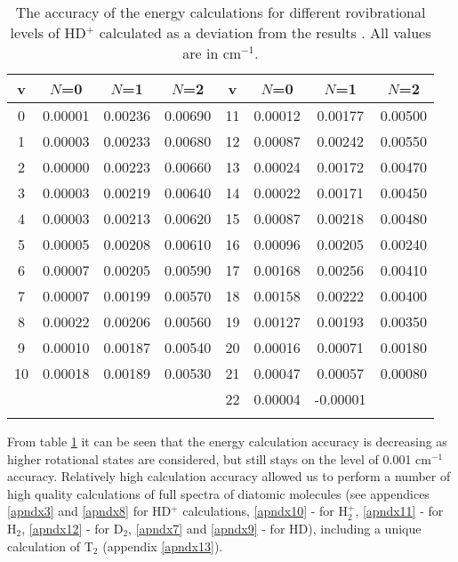 \begin{table}[t]
\caption[The accuracy of the energy 
calculations for different
rovibrational levels of HD$^+$]{The accuracy of the energy 
calculations for different
rovibrational levels of HD$^+$
calculated as a deviation from the results \cite{Karr}. 
All values are in cm$^{-1}$.}
\centering
\def\arraystretch{1.}
\setlength{\tabcolsep}{.75em}
\begin{tabular}{c c c c | c c c c}
\hline \hline
v & $N$=0 & $N$=1 & $N$=2 & v & $N$=0 & $N$=1 & $N$=2  \\
\hline
0	&	0.00001	&	0.00236	&	0.00690	& 11	&	0.00012	&	0.00177	&	0.00500	\\
1	&	0.00003	&	0.00233	&	0.00680	& 12	&	0.00087	&	0.00242	&	0.00550	\\
2	&	0.00000	&	0.00223	&	0.00660	& 13	&	0.00024	&	0.00172	&	0.00470	\\
3	&	0.00003	&	0.00219	&	0.00640	& 14	&	0.00022	&	0.00171	&	0.00450	\\
4	&	0.00003	&	0.00213	&	0.00620	& 15	&	0.00087	&	0.00218	&	0.00480	\\
5	&	0.00005	&	0.00208	&	0.00610	& 16	&	0.00096	&	0.00205	&	0.00240	\\
6	&	0.00007	&	0.00205	&	0.00590	& 17	&	0.00168	&	0.00256	&	0.00410	\\
7	&	0.00007	&	0.00199	&	0.00570	& 18	&	0.00158	&	0.00222	&	0.00400	\\
8	&	0.00022	&	0.00206	&	0.00560	& 19	&	0.00127	&	0.00193	&	0.00350	\\
9	&	0.00010	&	0.00187	&	0.00540	& 20	&	0.00016	&	0.00071	&	0.00180	\\
10	&	0.00018	&	0.00189	&	0.00530	& 21	&	0.00047	&	0.00057	&	0.00080	\\
    &            &           &           & 22	&	0.00004	&	-0.00001	&	     \\
\hline
\label{table_energy}
\end{tabular}
\end{table}

From table \ref{table_energy} it can be seen that the energy calculation
accuracy is decreasing as higher rotational states are considered, but still
stays on the level of 0.001 cm$^{-1}$ accuracy.
Relatively high calculation accuracy allowed us to perform a number
of high quality calculations of full spectra of diatomic molecules
(see appendices \ref{apndx3} and \ref{apndx8} for HD$^+$ calculations, 
\ref{apndx10} - for H$_2^+$, \ref{apndx11} - for H$_2$, \ref{apndx12} - 
for D$_2$, \ref{apndx7} and \ref{apndx9} - for HD), including 
a unique calculation of T$_2$ (appendix \ref{apndx13}). 

